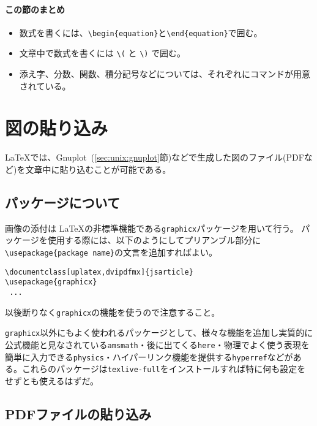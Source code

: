 \paragraph{この節のまとめ}

\begin{itemize}
    \item 数式を書くには、\verb|\begin{equation}|と\verb|\end{equation}|で囲む。
    \item 文章中で数式を書くには \texttt{\textbackslash(} と \texttt{\textbackslash)} で囲む。
    \item 添え字、分数、関数、積分記号などについては、それぞれにコマンドが用意されている。
\end{itemize}

\section{図の貼り込み}
\label{sec:latex:picture}

\LaTeX では、Gnuplot~(\ref{sec:unix:gnuplot}節)などで生成した図のファイル(PDFなど)を文章中に貼り込むことが可能である。

\subsection{パッケージについて}
\label{sec:latex:package}
画像の添付は \LaTeX の非標準機能である\texttt{graphicx}パッケージを用いて行う。
パッケージを使用する際には、以下のようにしてプリアンブル部分に\texttt{\textbackslash usepackage\{package name\}}の文言を追加すればよい。
\begin{reidai}
    \label{reidai:latex:package}
    \begin{verbatim}
\documentclass[uplatex,dvipdfmx]{jsarticle}
\usepackage{graphicx}
 ...
\end{verbatim}
\end{reidai} \noindent
以後断りなく\texttt{graphicx}の機能を使うので注意すること。

\texttt{graphicx}以外にもよく使われるパッケージとして、様々な機能を追加し実質的に公式機能と見なされている\texttt{amsmath}・後に出てくる\texttt{here}・物理でよく使う表現を簡単に入力できる\texttt{physics}・ハイパーリンク機能を提供する\texttt{hyperref}などがある。これらのパッケージは\texttt{texlive-full}をインストールすれば特に何も設定をせずとも使えるはずだ。

\subsection{PDFファイルの貼り込み}
\label{sec:latex:include_pdf}

